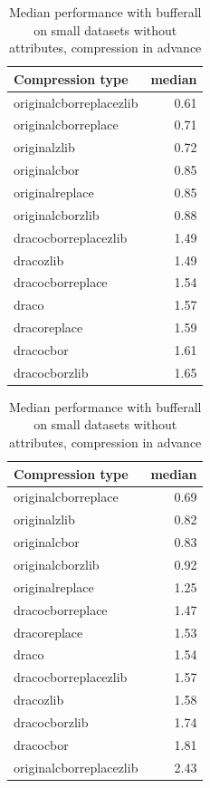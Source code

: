 \begin{table}[!h]
    \begin{minipage}{.5\linewidth}
      \caption{
Median performance with bufferall on small datasets, compression in advance}
\centering

\begin{tabular}{|l|r|}
\hline
Compression type & median\\
\hline
originalcborreplacezlib & 0.61\\
\hline
originalcborreplace & 0.71\\
\hline
originalzlib & 0.72\\
\hline
originalcbor & 0.85\\
\hline
originalreplace & 0.85\\
\hline
originalcborzlib & 0.88\\
\hline
dracocborreplacezlib & 1.49\\
\hline
dracozlib & 1.49\\
\hline
dracocborreplace & 1.54\\
\hline
draco & 1.57\\
\hline
dracoreplace & 1.59\\
\hline
dracocbor & 1.61\\
\hline
dracocborzlib & 1.65\\
\hline
\end{tabular}
\end{minipage}%
    \begin{minipage}{.5\linewidth}
      \centering
        \caption{
Median performance with bufferall on small datasets without attributes, compression in advance}

\begin{tabular}{|l|r|}
\hline
Compression type & median\\
\hline
originalcborreplace & 0.69\\
\hline
originalzlib & 0.82\\
\hline
originalcbor & 0.83\\
\hline
originalcborzlib & 0.92\\
\hline
originalreplace & 1.25\\
\hline
dracocborreplace & 1.47\\
\hline
dracoreplace & 1.53\\
\hline
draco & 1.54\\
\hline
dracocborreplacezlib & 1.57\\
\hline
dracozlib & 1.58\\
\hline
dracocborzlib & 1.74\\
\hline
dracocbor & 1.81\\
\hline
originalcborreplacezlib & 2.43\\
\hline
\end{tabular}
\end{minipage} 
\end{table}

